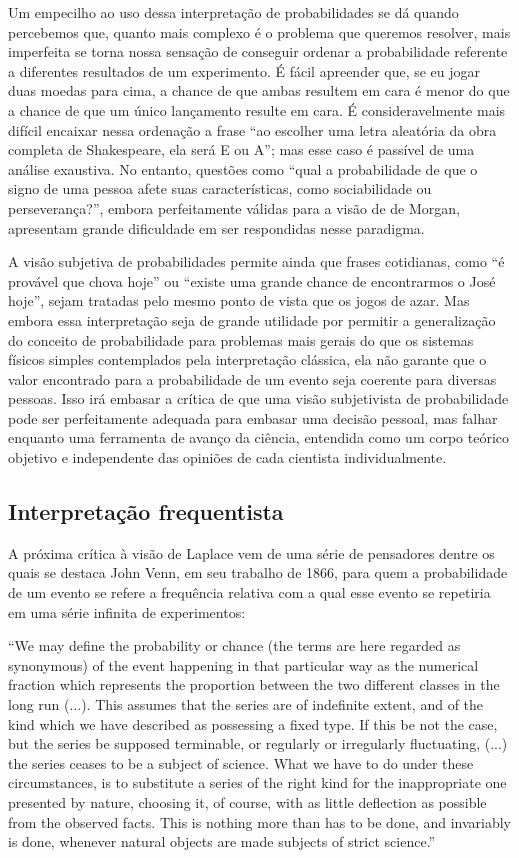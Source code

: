 \documentclass[12pt,a4paper]{article}
\begin{document}
Um empecilho ao uso dessa interpretação de probabilidades se dá quando percebemos que, quanto mais complexo é o 
problema que queremos resolver, mais imperfeita se torna nossa sensação de conseguir ordenar a probabilidade referente
a diferentes resultados de um experimento. É fácil apreender que, se eu jogar duas moedas para cima, a chance de que ambas 
resultem em cara é menor do que a chance de que um único lançamento resulte em cara. É consideravelmente mais difícil encaixar
nessa ordenação a frase ``ao escolher uma letra aleatória da obra completa de Shakespeare, ela será E ou A''; mas esse caso
é passível de uma análise exaustiva. No entanto, questões como ``qual a probabilidade de que o signo de uma pessoa afete
suas características, como sociabilidade ou perseverança?'', embora perfeitamente válidas para a visão de de Morgan, apresentam
grande dificuldade em ser respondidas nesse paradigma.

A visão subjetiva de probabilidades permite ainda que frases cotidianas, como ``é provável que chova hoje'' ou ``existe uma grande
chance de encontrarmos o José hoje'', sejam tratadas pelo mesmo ponto de vista que os jogos de azar. Mas
embora essa interpretação seja de grande utilidade por permitir a generalização do conceito de probabilidade para problemas
mais gerais do que os sistemas físicos simples contemplados pela interpretação clássica, ela não garante que o valor encontrado
para a probabilidade de um evento seja coerente para diversas pessoas. Isso irá embasar a crítica de que uma visão subjetivista 
de probabilidade pode ser perfeitamente adequada para embasar uma decisão pessoal, mas falhar enquanto uma ferramenta de 
avanço da ciência, entendida como um corpo teórico objetivo e independente das opiniões de cada cientista individualmente.

\subsection{Interpretação frequentista}
A próxima crítica à visão de Laplace vem de uma série de pensadores dentre os quais se destaca John Venn, em seu trabalho de 
1866, para quem a probabilidade de um evento se refere a frequência relativa com a qual esse evento se repetiria em uma
série infinita de experimentos:

``We may define the probability or chance (the terms are here regarded as synonymous) of the event happening in that
particular way as the numerical fraction which represents the proportion between the two different classes in the long run (...).
This assumes that the series are of indefinite extent, and of the kind which we have described as possessing a fixed type.
If this be not the case, but the series be supposed terminable, or regularly or irregularly fluctuating, (...) the series ceases
to be a subject of science. What we have to do under these circumstances, is to substitute a series of the right kind for
the inappropriate one presented by nature, choosing it, of course, with as little deflection as possible from the observed facts.
This is nothing more than has to be done, and invariably is done, whenever natural objects are made subjects of strict science.''
\cite{Venn1866}
\end{document}
